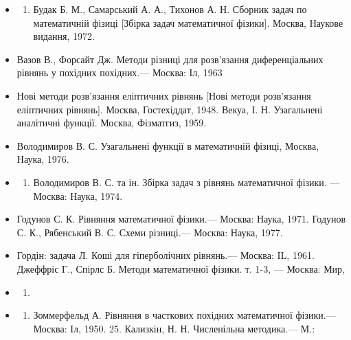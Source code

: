 \documentclass[
]{article}
\providecommand{\tightlist}{%
  \setlength{\itemsep}{0pt}\setlength{\parskip}{0pt}}
\begin{document}
{{{{\begin{itemize}
\begin{enumerate}
  \tightlist
  \item
    Біцадзе А. В., Калініченко Д. К. Збірка задач з рівнянь математичної
    фізики. Москва, Наука, 1977.
  \end{enumerate}
\item
  \begin{enumerate}
  \def\labelenumi{\arabic{enumi}.}
  \setcounter{enumi}{13}
  \tightlist
  \item
    Будак Б. М., Самарський А. А., Тихонов А. Н. Сборник задач по
    математичній фізиці {[}Збірка задач математичної фізики{]}. Москва,
    Наукове видання, 1972.
  \end{enumerate}
\item
  Вазов В., Форсайт Дж. Методи різниці для розв'язання диференціальних
  рівнянь у похідних похідних.--- Москва: Іл, 1963
\item
  Нові методи розв'язання еліптичних рівнянь {[}Нові методи розв'язання
  еліптичних рівнянь{]}. Москва, Гостехіддат, 1948. Векуа, І. Н.
  Узагальнені аналітичні функції. Москва, Фізматгиз, 1959.
\item
  Володимиров В. С. Узагальнені функції в математичній фізиці, Москва,
  Наука, 1976.
\item
  \begin{enumerate}
  \def\labelenumi{\arabic{enumi}.}
  \setcounter{enumi}{18}
  \tightlist
  \item
    Володимиров В. С. та ін. Збірка задач з рівнянь математичної фізики.
    --- Москва: Наука, 1974.
  \end{enumerate}
\item
  Годунов С. К. Рівняння математичної фізики.--- Москва: Наука, 1971.
  Годунов С. К., Рябенський В. С. Схеми різниці.--- Москва: Наука, 1977.
\item
  Гордін: задача Л. Коші для гіперболічних рівнянь.--- Москва: IL, 1961.
  Джеффріс Г., Спірлс Б. Методи математичної фізики. т. 1-3, --- Москва:
  Мир,
\item
  \begin{enumerate}
  \def\labelenumi{\arabic{enumi}.}
  \setcounter{enumi}{1969}
  \tightlist
  \item
  \end{enumerate}
\item
  \begin{enumerate}
  \def\labelenumi{\arabic{enumi}.}
  \setcounter{enumi}{23}
  \tightlist
  \item
    Зоммерфельд А. Рівняння в часткових похідних математичної фізики.---
    Москва: Іл, 1950. 25. Кализкін, Н. Н. Численільна методика.--- М.:

\end{enumerate}
\end{itemize}}}}}
\end{document}
